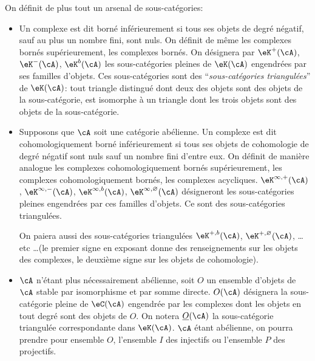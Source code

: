 On d\'efinit de plus tout un arsenal de sous-cat\'egories: 
\begin{itemize}
  \item Un complexe est dit born\'e inf\'erieurement si tous ses objets de 
    degr\'e n\'egatif, sauf au plus un nombre fini, sont nuls. On d\'efinit de 
    m\^eme les complexes born\'es sup\'erieurement, les complexes born\'es. On 
    d\'esignera par $\eK^+(\cA)$, $\eK^-(\cA)$, $\eK^b(\cA)$ les 
    sous-cat\'egories pleines de $\eK(\cA)$ engendr\'ees par ses familles 
    d'objets. Ces sous-cat\'egories sont des ``\emph{sous-cat\'egories 
    triangul\'ees}'' de $\eK(\cA)$: tout triangle distingu\'e dont deux des 
    objets sont des objets de la sous-cat\'egorie, est isomorphe \`a un 
    triangle dont les trois objets sont des objets de la sous-cat\'egorie. 
  \item Supposons que $\cA$ soit une cat\'egorie ab\'elienne. Un complexe est 
    dit cohomologiquement born\'e inf\'erieurement si tous ses objets de 
    cohomologie de degr\'e n\'egatif sont nuls sauf un nombre fini d'entre 
    eux. On d\'efinit de mani\`ere analogue les complexes cohomologiquement 
    born\'es sup\'erieurement, les complexes cohomologiquement born\'es, les 
    complexes acycliques. $\eK^{\infty,+}(\cA)$, $\eK^{\infty,-}(\cA)$, 
    $\eK^{\infty,b}(\cA)$, $\eK^{\infty,\varnothing}(\cA)$ d\'esigneront les 
    sous-cat\'egories pleines engendr\'ees par ces familles d'objets. Ce sont 
    des sous-cat\'egories triangul\'ees. 
    
    On paiera aussi des sous-cat\'egories triangul\'ees $\eK^{+,b}(\cA)$, 
    $\eK^{+,\varnothing}(\cA)$, \ldots etc \ldots (le premier signe en 
    exposant donne des renseignements sur les objets des complexes, le 
    deuxi\`eme signe sur les objets de cohomologie). 
  \item $\cA$ n'\'etant plus n\'ecessairement ab\'elienne, soit $O$ un 
    ensemble d'objets de $\cA$ stable par isomorphisme et par somme directe. 
    $O(\cA)$ d\'esignera la sous-cat\'egorie pleine de $\eC(\cA)$ engendr\'ee 
    par les complexes dont les objets en tout degr\'e sont des objets de $O$. 
    On notera $\underline O(\cA)$ la sous-cat\'egorie triangul\'ee 
    correspondante dans $\eK(\cA)$. $\cA$ \'etant ab\'elienne, on pourra 
    prendre pour ensemble $O$, l'ensemble $I$ des injectifs ou l'ensemble $P$ 
    des projectifs. 
\end{itemize}





